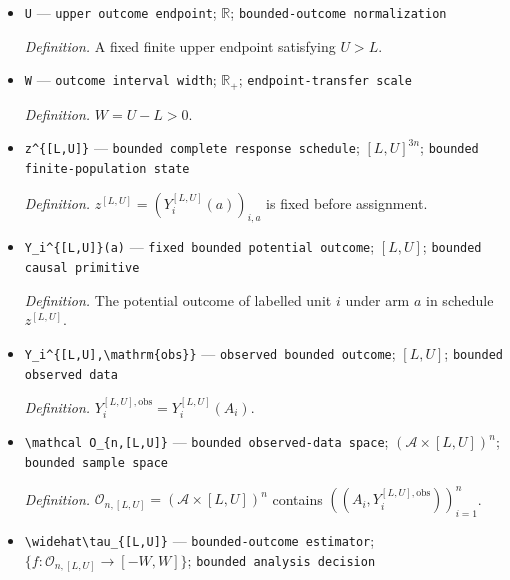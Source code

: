 \documentclass{article}
\begin{document}
\begin{itemize}
  \par\smallskip\noindent\emph{Definition.} \(\epsilon_n^{\mathrm{bridge}}=n^{-1/12}\).
  \item \texttt{U} --- \texttt{upper outcome endpoint}; \(\mathbb R\); \texttt{bounded-\allowbreak{}outcome normalization}
  \par\smallskip\noindent\emph{Definition.} A fixed finite upper endpoint satisfying \(U>L\).
  \item \texttt{W} --- \texttt{outcome interval width}; \(\mathbb R_+\); \texttt{endpoint-\allowbreak{}transfer scale}
  \par\smallskip\noindent\emph{Definition.} \(W=U-L>0\).
  \item \texttt{z\textasciicircum{}\{[L,\allowbreak{}U]\}\allowbreak{}} --- \texttt{bounded complete response schedule}; \([L,U]^{3n}\); \texttt{bounded finite-\allowbreak{}population state}
  \par\smallskip\noindent\emph{Definition.} \(z^{[L,U]}=(Y_i^{[L,U]}(a))_{i,a}\) is fixed before assignment.
  \item \texttt{Y\_\allowbreak{}i\textasciicircum{}\{[L,\allowbreak{}U]\}\allowbreak{}(a)} --- \texttt{fixed bounded potential outcome}; \([L,U]\); \texttt{bounded causal primitive}
  \par\smallskip\noindent\emph{Definition.} The potential outcome of labelled unit \(i\) under arm \(a\) in schedule \(z^{[L,U]}\).
  \item \texttt{Y\_\allowbreak{}i\textasciicircum{}\{[L,\allowbreak{}U],\allowbreak{}\textbackslash{}\allowbreak{}mathrm\{obs\}\allowbreak{}\}\allowbreak{}} --- \texttt{observed bounded outcome}; \([L,U]\); \texttt{bounded observed data}
  \par\smallskip\noindent\emph{Definition.} \(Y_i^{[L,U],\mathrm{obs}}=Y_i^{[L,U]}(A_i)\).
  \item \texttt{\textbackslash{}\allowbreak{}mathcal O\_\allowbreak{}\{n,\allowbreak{}[L,\allowbreak{}U]\}\allowbreak{}} --- \texttt{bounded observed-\allowbreak{}data space}; \((\mathcal A\times[L,U])^n\); \texttt{bounded sample space}
  \par\smallskip\noindent\emph{Definition.} \(\mathcal O_{n,[L,U]}=(\mathcal A\times[L,U])^n\) contains \(((A_i,Y_i^{[L,U],\mathrm{obs}}))_{i=1}^n\).
  \item \texttt{\textbackslash{}\allowbreak{}widehat\textbackslash{}\allowbreak{}tau\_\allowbreak{}\{[L,\allowbreak{}U]\}\allowbreak{}} --- \texttt{bounded-\allowbreak{}outcome estimator}; \(\{f:\mathcal O_{n,[L,U]}\to[-W,W]\}\); \texttt{bounded analysis decision}

\end{itemize}
\end{document}
